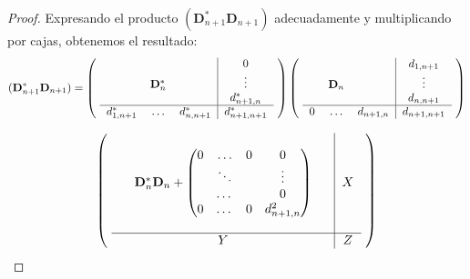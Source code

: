 \begin{proof} Expresando el producto $(\mathbf{D}_{n+1}^{*}\mathbf{D}_{n+1})$ adecuadamente y multiplicando por cajas, obtenemos el resultado:
  \[ (\mathbf{D}_{n+1}^{*}\mathbf{D}_{n+1}) =
    \left (   \mbox{
      \begin{tabular}{ccc|c}
                      & $$                   &               & $0$             \\
        $$            & $\mathbf{D}_{n}^{*}$ &               & $\vdots$        \\
                      &                      &               & $d_{n+1,n}^*$   \\  \hline

        $d_{1,n+1}^*$ & $\ldots$             & $d_{n,n+1}^*$ & $d_{n+1,n+1}^*$ \\
      \end{tabular}
    } \right ) \left (   \mbox{
      \begin{tabular}{ccc|c}
            & $$               &             & $d_{1,n+1}$   \\
        $$  & $\mathbf{D}_{n}$ &             & $\vdots$      \\
            &                  &             & $d_{n,n+1}$   \\  \hline

        $0$ & $\ldots$         & $d_{n+1,n}$ & $d_{n+1,n+1}$ \\
      \end{tabular}
    } \right )
  \]

  \[
    \left (   \mbox{
      \begin{tabular}{ccc|c}
           & $$                                                &    &       \\
        $$ & $\mathbf{D}_{n}^{*}\mathbf{D}_{n}+\begin{pmatrix}
                                                   0 & \ldots & 0 & 0           \\
                                                     & \ddots &   & \vdots      \\
                                                     & \dots  &   & 0           \\
                                                   0 & \dots  & 0 & d_{n+1,n}^2
                                                 \end{pmatrix}$ &    & $X$ \\
           &                                                   &    & $$    \\  \hline

        $$ & $Y$                                               & $$ & $Z$   \\
      \end{tabular}
    } \right )
  \]
\end{proof}


